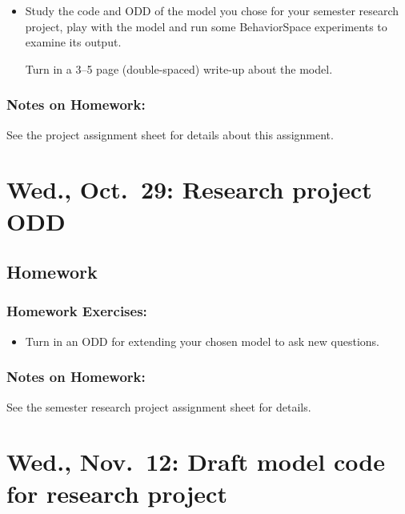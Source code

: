 \documentclass[
]{article}
\providecommand{\tightlist}{%
  \setlength{\itemsep}{0pt}\setlength{\parskip}{0pt}}
\begin{document}
\begin{itemize}
\item
  Study the code and ODD of the model you chose for your semester
  research project, play with the model and run some BehaviorSpace
  experiments to examine its output.

  Turn in a 3--5 page (double-spaced) write-up about the model.
\end{itemize}

\subsubsection{Notes on Homework:}\label{notes-on-homework-6}

See the project assignment sheet for details about this assignment.

\section{Wed., Oct.~29: Research project
ODD}\label{wed.-oct.-29-research-project-odd}

\subsection{Homework}\label{homework-11}

\subsubsection{Homework Exercises:}\label{homework-exercises-11}

\begin{itemize}
\tightlist
\item
  Turn in an ODD for extending your chosen model to ask new questions.
\end{itemize}

\subsubsection{Notes on Homework:}\label{notes-on-homework-7}

See the semester research project assignment sheet for details.

\section{Wed., Nov.~12: Draft model code for research
project}\label{wed.-nov.-12-draft-model-code-for-research-project}
\end{document}
